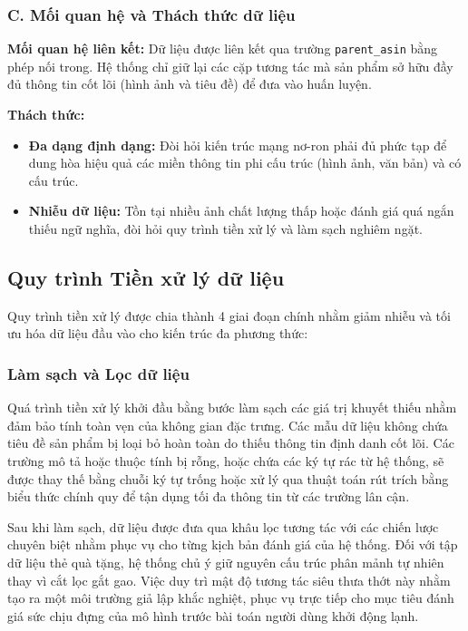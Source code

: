\subsubsection*{C. Mối quan hệ và Thách thức dữ liệu}
\textbf{Mối quan hệ liên kết:} Dữ liệu được liên kết qua trường \texttt{parent\_asin} bằng phép nối trong. Hệ thống chỉ giữ lại các cặp tương tác mà sản phẩm sở hữu đầy đủ thông tin cốt lõi (hình ảnh và tiêu đề) để đưa vào huấn luyện.

\textbf{Thách thức:} 
\begin{itemize}
    \item \textbf{Đa dạng định dạng:} Đòi hỏi kiến trúc mạng nơ-ron phải đủ phức tạp để dung hòa hiệu quả các miền thông tin phi cấu trúc (hình ảnh, văn bản) và có cấu trúc.
    \item \textbf{Nhiễu dữ liệu:} Tồn tại nhiều ảnh chất lượng thấp hoặc đánh giá quá ngắn thiếu ngữ nghĩa, đòi hỏi quy trình tiền xử lý và làm sạch nghiêm ngặt.
\end{itemize}


\subsection{Quy trình Tiền xử lý dữ liệu}

Quy trình tiền xử lý được chia thành 4 giai đoạn chính nhằm giảm nhiễu và tối ưu hóa dữ liệu đầu vào cho kiến trúc đa phương thức:

\subsubsection{Làm sạch và Lọc dữ liệu}
\label{sec:preprocessing}

Quá trình tiền xử lý khởi đầu bằng bước làm sạch các giá trị khuyết thiếu nhằm đảm bảo tính toàn vẹn của không gian đặc trưng. Các mẫu dữ liệu không chứa tiêu đề sản phẩm bị loại bỏ hoàn toàn do thiếu thông tin định danh cốt lõi. Các trường mô tả hoặc thuộc tính bị rỗng, hoặc chứa các ký tự rác từ hệ thống, sẽ được thay thế bằng chuỗi ký tự trống hoặc xử lý qua thuật toán rút trích bằng biểu thức chính quy để tận dụng tối đa thông tin từ các trường lân cận.

Sau khi làm sạch, dữ liệu được đưa qua khâu lọc tương tác với các chiến lược chuyên biệt nhằm phục vụ cho từng kịch bản đánh giá của hệ thống. Đối với tập dữ liệu thẻ quà tặng, hệ thống chủ ý giữ nguyên cấu trúc phân mảnh tự nhiên thay vì cắt lọc gắt gao. Việc duy trì mật độ tương tác siêu thưa thớt này nhằm tạo ra một môi trường giả lập khắc nghiệt, phục vụ trực tiếp cho mục tiêu đánh giá sức chịu đựng của mô hình trước bài toán người dùng khởi động lạnh.

